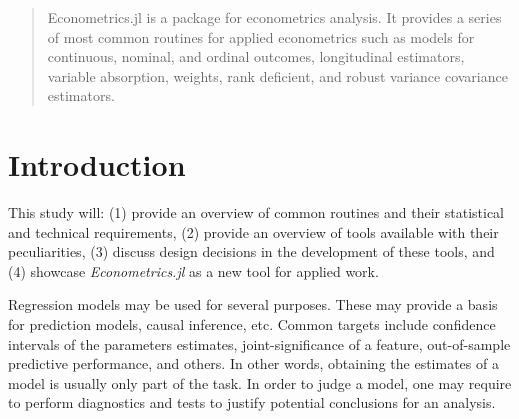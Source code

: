 \documentclass{juliacon}
\begin{document}


\maketitle

\begin{abstract}


Econometrics.jl is a package for econometrics analysis. It provides a series of most common routines for applied econometrics such as models for continuous, nominal, and ordinal outcomes, longitudinal estimators, variable absorption, weights, rank deficient, and robust variance covariance estimators.

\end{abstract}

\section{Introduction}

This study will: (1) provide an overview of common routines and their statistical and technical requirements, (2) provide an overview of tools available with their peculiarities, (3) discuss design decisions in the development of these tools, and (4) showcase \textit{Econometrics.jl} as a new tool for applied work.

Regression models may be used for several purposes. These may provide a basis for prediction models, causal inference, etc. Common targets include confidence intervals of the parameters estimates, joint-significance of a feature, out-of-sample predictive performance, and others. In other words, obtaining the estimates of a model is usually only part of the task. In order to judge a model, one may require to perform diagnostics and tests to justify potential conclusions for an analysis.
\end{document}
